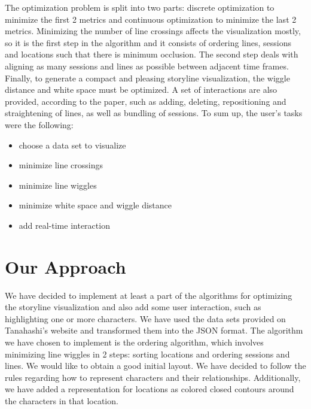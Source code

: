 \documentclass{report}
\begin{document}
\par
The optimization problem is split into two parts: discrete optimization to minimize the first 2 metrics and continuous optimization to minimize the last 2 metrics. Minimizing the number of line crossings affects the visualization mostly, so it is the first step in the algorithm and it consists of ordering lines, sessions and locations such that there is minimum occlusion. The second step deals with aligning as many sessions and lines as possible between adjacent time frames. Finally, to generate a compact and pleasing storyline visualization, the wiggle distance and white space must be optimized. A set of interactions are also provided, according to the paper, such as adding, deleting, repositioning and straightening of lines, as well as bundling of sessions. To sum up, the user's tasks were the following:
\begin{itemize}
\item choose a data set to visualize
\item minimize line crossings
\item minimize line wiggles
\item minimize white space and wiggle distance
\item add real-time interaction
\end{itemize}

\chapter{Our Approach}
\par
We have decided to implement at least a part of the algorithms for optimizing the storyline visualization and also add some user interaction, such as highlighting one or more characters. We have used the data sets provided on Tanahashi's website \cite{website:tanahashi} and transformed them into the JSON format. The algorithm we have chosen to implement is the ordering algorithm, which involves minimizing line wiggles in 2 steps: sorting locations and ordering sessions and lines. We would like to obtain a good initial layout. We have decided to follow the rules regarding how to represent characters and their relationships. Additionally, we have added a representation for locations as colored closed contours around the characters in that location.
\end{document}
